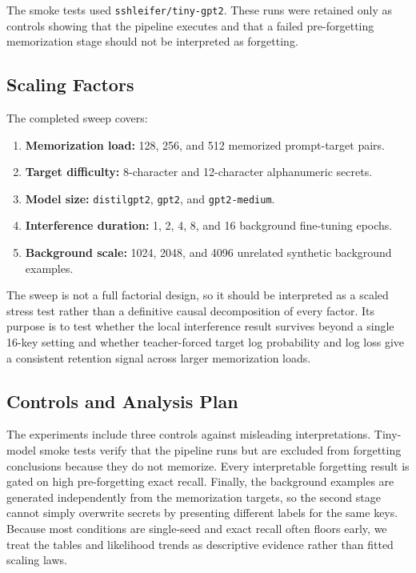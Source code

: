 \documentclass{article}
\begin{document}
The smoke tests used \texttt{sshleifer/\allowbreak{}tiny-gpt2}. These runs were retained only as controls showing that the pipeline executes and that a failed pre-forgetting memorization stage should not be interpreted as forgetting.

\subsection{Scaling Factors}

The completed sweep covers:

\begin{enumerate}[leftmargin=*]
    \item \textbf{Memorization load:} 128, 256, and 512 memorized prompt-target pairs.
    \item \textbf{Target difficulty:} 8-character and 12-character alphanumeric secrets.
    \item \textbf{Model size:} \texttt{distilgpt2}, \texttt{gpt2}, and \texttt{gpt2-medium}.
    \item \textbf{Interference duration:} 1, 2, 4, 8, and 16 background fine-tuning epochs.
    \item \textbf{Background scale:} 1024, 2048, and 4096 unrelated synthetic background examples.
\end{enumerate}

The sweep is not a full factorial design, so it should be interpreted as a scaled stress test rather than a definitive causal decomposition of every factor. Its purpose is to test whether the local interference result survives beyond a single 16-key setting and whether teacher-forced target log probability and log loss give a consistent retention signal across larger memorization loads.

\subsection{Controls and Analysis Plan}

The experiments include three controls against misleading interpretations. Tiny-model smoke tests verify that the pipeline runs but are excluded from forgetting conclusions because they do not memorize. Every interpretable forgetting result is gated on high pre-forgetting exact recall. Finally, the background examples are generated independently from the memorization targets, so the second stage cannot simply overwrite secrets by presenting different labels for the same keys. Because most conditions are single-seed and exact recall often floors early, we treat the tables and likelihood trends as descriptive evidence rather than fitted scaling laws.
\end{document}
